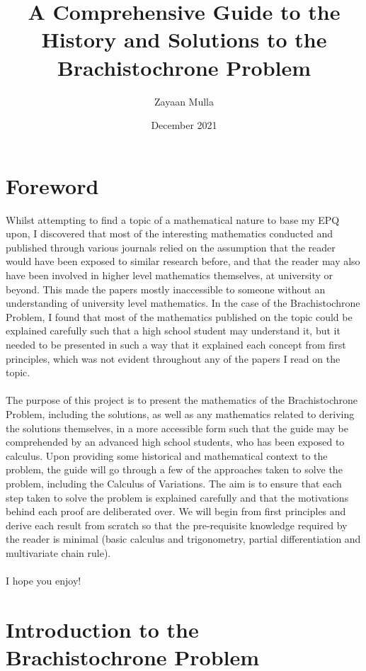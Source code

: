 \documentclass[12pt]{report}
\title{A Comprehensive Guide to the History and Solutions to the Brachistochrone Problem}
\author{Zayaan Mulla}
\date{December 2021}
\begin{document}
\maketitle

\tableofcontents

\chapter{Foreword}
Whilst attempting to find a topic of a mathematical nature to base my EPQ upon, I discovered that most of the interesting mathematics conducted and published through various journals relied on the assumption that the reader would have been exposed to similar research before, and that the reader may also have been involved in higher level mathematics themselves, at university or beyond. This made the papers mostly inaccessible to someone without an understanding of university level mathematics. In the case of the Brachistochrone Problem, I found that most of the mathematics published on the topic could be explained carefully such that a high school student may understand it, but it needed to be presented in such a way that it explained each concept from first principles, which was not evident throughout any of the papers I read on the topic.
\\\\
The purpose of this project is to present the mathematics of the Brachistochrone Problem, including the solutions, as well as any mathematics related to deriving the solutions themselves, in a more accessible form such that the guide may be comprehended by an advanced high school students, who has been exposed to calculus. Upon providing some historical and mathematical context to the problem, the guide will go through a few of the approaches taken to solve the problem, including the Calculus of Variations. The aim is to ensure that each step taken to solve the problem is explained carefully and that the motivations behind each proof are deliberated over. We will begin from first principles and derive each result from scratch so that the pre-requisite knowledge required by the reader is minimal (basic calculus and trigonometry, partial differentiation and multivariate chain rule).
\\\\
I hope you enjoy!

\chapter{Introduction to the Brachistochrone Problem}
\end{document}
